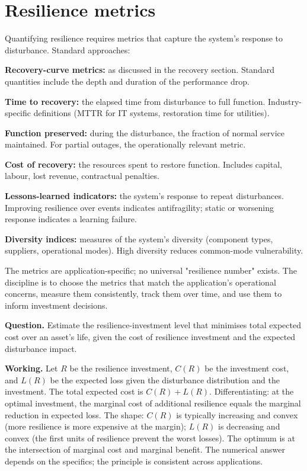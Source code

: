 \section{Resilience metrics}

Quantifying resilience requires metrics that capture the system's response to disturbance. Standard approaches:

\textbf{Recovery-curve metrics:} as discussed in the recovery section. Standard quantities include the depth and duration of the performance drop.

\textbf{Time to recovery:} the elapsed time from disturbance to full function. Industry-specific definitions (MTTR for IT systems, restoration time for utilities).

\textbf{Function preserved:} during the disturbance, the fraction of normal service maintained. For partial outages, the operationally relevant metric.

\textbf{Cost of recovery:} the resources spent to restore function. Includes capital, labour, lost revenue, contractual penalties.

\textbf{Lessons-learned indicators:} the system's response to repeat disturbances. Improving resilience over events indicates antifragility; static or worsening response indicates a learning failure.

\textbf{Diversity indices:} measures of the system's diversity (component types, suppliers, operational modes). High diversity reduces common-mode vulnerability.

The metrics are application-specific; no universal "resilience number" exists. The discipline is to choose the metrics that match the application's operational concerns, measure them consistently, track them over time, and use them to inform investment decisions.

\begin{estimation}
\textbf{Question.} Estimate the resilience-investment level that minimises total expected cost over an asset's life, given the cost of resilience investment and the expected disturbance impact.

\textbf{Working.} Let $R$ be the resilience investment, $C(R)$ be the investment cost, and $L(R)$ be the expected loss given the disturbance distribution and the investment. The total expected cost is $C(R) + L(R)$. Differentiating: at the optimal investment, the marginal cost of additional resilience equals the marginal reduction in expected loss. The shape: $C(R)$ is typically increasing and convex (more resilience is more expensive at the margin); $L(R)$ is decreasing and convex (the first units of resilience prevent the worst losses). The optimum is at the intersection of marginal cost and marginal benefit. The numerical answer depends on the specifics; the principle is consistent across applications.
\end{estimation}

